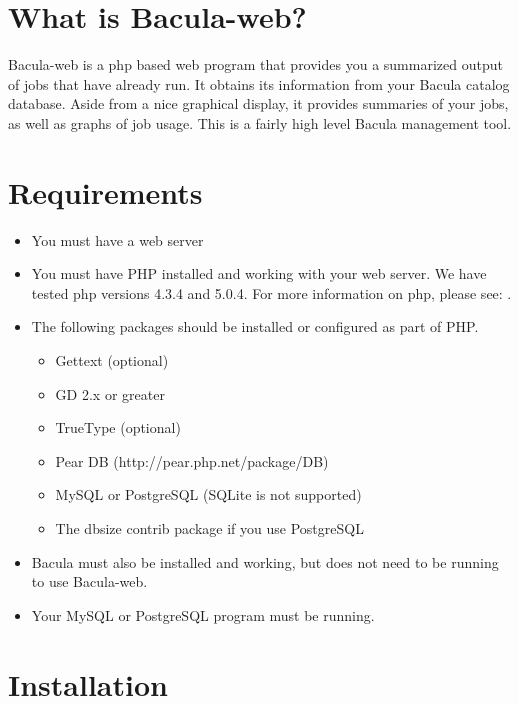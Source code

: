 
\section*{What is Bacula-web?}
\label{_ChapterStart1}


Bacula-web is a php based web program that provides you a
summarized output of jobs that have already run. It obtains 
its information from your Bacula catalog database. Aside from a
nice graphical display, it provides summaries of your 
jobs, as well as graphs of job usage. This is a fairly high
level Bacula management tool.

\section*{Requirements}

\begin{itemize}
\item You must have a web server
\item You must have PHP installed and working
      with your web server. We have tested 
      php versions 4.3.4 and 5.0.4.  For more information
      on php, please see:
      .
\item The following packages should be installed
      or configured as part of PHP.
   \begin{itemize}
   \item Gettext (optional)
   \item GD 2.x or greater
   \item TrueType (optional)
   \item Pear DB (http://pear.php.net/package/DB)
   \item MySQL or PostgreSQL (SQLite is not supported)
   \item The dbsize contrib package if you use PostgreSQL
   \end{itemize}
\item Bacula must also be installed and working, but does not
      need to be running to use Bacula-web.
\item Your MySQL or PostgreSQL program must be running.
\end{itemize}

\section*{Installation}

